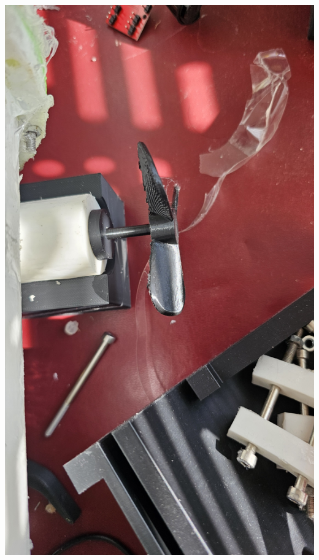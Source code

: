 \documentclass[11pt,a4paper,titlepage]{report}
\begin{document}
	\begin{center}
		\label{picture:images_parts_4}
		\includegraphics[width=\linewidth]{assets/SideProp1.jpg}
	\end{center}
\end{document}
